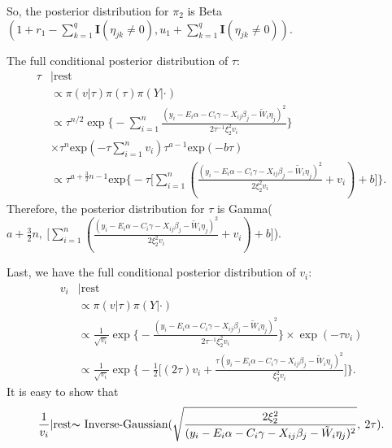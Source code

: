 \documentclass[12pt]{article}
\begin{document}
So, the posterior distribution for $\pi_2$ is Beta $(1+r_1-\sum_{k=1}^{q}\textbf{I}{(\eta_{jk} \neq 0)}, u_1+\sum_{k=1}^{q}\textbf{I}{(\eta_{jk} \neq 0)})$.\par
The full conditional posterior distribution of $\tau$:
\begin{equation*}
\begin{aligned}
\tau&|\text{rest} \\
& \propto \pi(v|\tau)\pi(\tau)\pi(Y|\cdot) \\
& \propto {\tau}^{n/2}\exp\Big\{- \sum_{i=1}^{n}\frac{(y_i - E_i \alpha - C_i \gamma - X_{ij}\beta_{j} - \tilde{W}_{i}\eta_{j})^2}{2 \tau^{-1} \xi_{2}^{2} v_i} \Big\}\\
& \times {\tau}^n \text{exp}(-\tau\sum_{i=1}^{n} v_i) \tau^{a-1} \text{exp}(-b\tau)\\
&\propto \tau^{a+\frac{3}{2}n-1} \text{exp}\Big\{-\tau\big[\sum_{i=1}^{n}(\frac{(y_i - E_i \alpha - C_i \gamma - X_{ij}\beta_{j} - \tilde{W}_{i}\eta_{j})^2}{2  \xi_{2}^{2} v_i} +v_i)+b\big] \Big\}.
\end{aligned}
\end{equation*}
Therefore, the posterior distribution for $\tau$ is Gamma($a+\frac{3}{2}n, \:\big[\sum_{i=1}^{n}(\frac{(y_i - E_i \alpha - C_i \gamma - X_{ij}\beta_{j} - \tilde{W}_{i}\eta_{j})^2}{2  \xi_{2}^{2} v_i} +v_i)+b\big]$).\par
Last, we have the full conditional posterior distribution of $v_i$:
\begin{equation*}
\begin{aligned}
v_i&|\text{rest} \\
& \propto \pi(v|\tau)\pi(Y|\cdot) \\
& \propto \frac{1}{\sqrt{v_i}} \exp\Big\{- \frac{(y_i - E_i \alpha - C_i \gamma - X_{ij}\beta_{j} - \tilde{W}_{i}\eta_{j})^2}{2 \tau^{-1} \xi_{2}^{2} v_i} \Big\}
\times\exp(-\tau v_i)\\
& \propto \frac{1}{\sqrt{v_i}} \exp\Big\{-\frac{1}{2} \big[ (2\tau)v_i + \frac{\tau(y_i - E_i \alpha - C_i \gamma - X_{ij}\beta_{j} - \tilde{W}_{i}\eta_{j})^2}{\xi_{2}^{2} v_i}\big] \Big\}.
\end{aligned}
\end{equation*}
It is easy to show that 
\begin{equation*}
\frac{1}{v_i}|\text{rest} {\thicksim}\text{ Inverse-Gaussian} (\sqrt{\frac{2 \xi_2^2}{(y_i - E_i \alpha - C_i \gamma - X_{ij}\beta_{j} - \tilde{W}_{i}\eta_{j})^2}}, \:2\tau).
\end{equation*}
\end{document}
